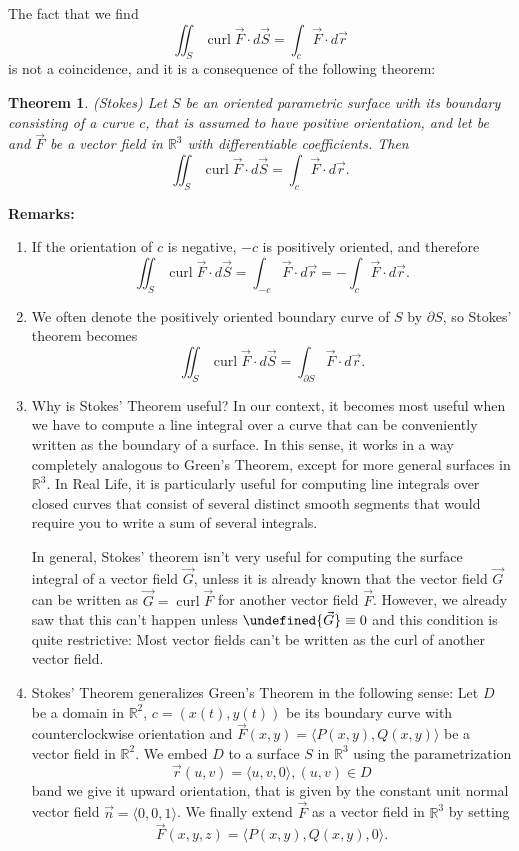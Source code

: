 \documentclass[12pt]{article}
\newcommand{\p}{\partial}
\newcommand{\R}{ \mathbb{R}}
\newcommand{\vr}{\vec{r}{}}
\newcommand{\vF}{\vec{F}}
\renewcommand{\lg}{\langle}
\newcommand{\rg}{\rangle}
\DeclareMathOperator{\curl}{curl}
\newcommand{\vn}{\vec{n}}
\newcommand{\vS}{\vec{S}}
\newcommand{\vG}{\vec{G}}
\let \div \undefined
\DeclareMathOperator{\div}{div}
\newtheorem{theorem}{Theorem}
\begin{document}
The fact that we find $$\iint_S\curl \vF\cdot d\vS=\int_c \vF\cdot d\vr$$ is not a coincidence, and it is a consequence of the following theorem:


\begin{theorem}
(Stokes) Let $S$ be an oriented parametric surface with its boundary consisting of a curve $c$, that is assumed to have positive orientation, and let be and $\vF$ be a vector field in $\R^3$ with differentiable coefficients. Then $$\iint_S\curl \vF\cdot d\vS=\int_c \vF\cdot d\vr.$$ 
\end{theorem}



\textbf{Remarks:} 
\begin{enumerate}
\item If the orientation of $c$ is negative, $-c$ is positively oriented, and therefore
$$\iint_S\curl \vF\cdot d\vS=\int_{-c} \vF\cdot d\vr=-\int_{c} \vF\cdot d\vr.$$

\item We often denote the positively oriented boundary curve of $S$ by $\p S$, so Stokes' theorem becomes  $$\iint_S\curl \vF\cdot d\vS=\int_{\p S} \vF\cdot d\vr.$$ 


\item Why is Stokes' Theorem useful? In our context, it becomes most useful when we have to compute a line integral over a curve that can be conveniently written as the boundary of a surface. In this sense, it works in a way completely analogous to Green's Theorem, except for more general surfaces in $\R^3$. In Real Life, it is particularly useful for computing line integrals over closed curves that consist of several distinct smooth segments that would require you to write a sum of several integrals.

In general, Stokes' theorem isn't very useful for computing the surface integral of a vector field $\vG$, unless it is already known that the vector field $\vG$ can be written as $\vG=\curl\vF$ for another vector field $\vF$. However, we already saw that this can't happen unless $\div{\vG}\equiv 0$ and this condition is quite restrictive: Most vector fields can't be written as the curl of another vector field.





\item Stokes' Theorem generalizes Green's Theorem in the following sense: Let $D$ be a domain in $\R^2$, $c=(x(t),y(t))$ be its boundary curve with counterclockwise orientation and $\vF(x,y)=\lg P(x,y),Q(x,y)\rg$ be a vector field in $\R^2$. We embed $D$ to a surface $S$ in $\R^3$ using the parametrization $$\vr(u,v)=\lg u,v,0\rg,(u,v)\in D$$ band we give it upward orientation, that is given by the constant unit normal vector field $\vn=\lg 0,0,1\rg$. We finally extend $\vF$ as a vector field in $\R^3$ by setting $$\vF(x,y,z)=\lg P(x,y),Q(x,y),0\rg.$$


\end{enumerate}
\end{document}
